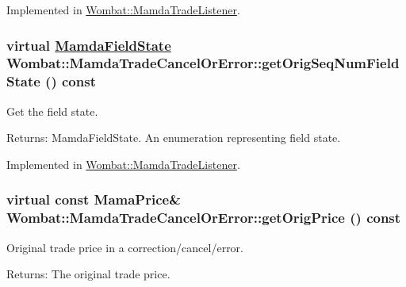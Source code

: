 Implemented in \hyperlink{classWombat_1_1MamdaTradeListener_571a08fa4c669481abf0417a36064205}{Wombat::Mamda\-Trade\-Listener}.\hypertarget{classWombat_1_1MamdaTradeCancelOrError_fb7e94b42033b155bc02f70ed2756062}{
\subsubsection[getOrigSeqNumFieldState]{\setlength{\rightskip}{0pt plus 5cm}virtual \hyperlink{namespaceWombat_93aac974f2ab713554fd12a1fa3b7d2a}{Mamda\-Field\-State} Wombat::Mamda\-Trade\-Cancel\-Or\-Error::get\-Orig\-Seq\-Num\-Field\-State () const}}
\label{classWombat_1_1MamdaTradeCancelOrError_fb7e94b42033b155bc02f70ed2756062}


Get the field state. 

\begin{Desc}
\item[Returns:]Mamda\-Field\-State. An enumeration representing field state. \end{Desc}


Implemented in \hyperlink{classWombat_1_1MamdaTradeListener_0767574a3f0c34ae680fbbfadf296e0e}{Wombat::Mamda\-Trade\-Listener}.\hypertarget{classWombat_1_1MamdaTradeCancelOrError_f30fe9dc7c0325555e8fa31f0865d4b4}{
\subsubsection[getOrigPrice]{\setlength{\rightskip}{0pt plus 5cm}virtual const Mama\-Price\& Wombat::Mamda\-Trade\-Cancel\-Or\-Error::get\-Orig\-Price () const}}
\label{classWombat_1_1MamdaTradeCancelOrError_f30fe9dc7c0325555e8fa31f0865d4b4}


Original trade price in a correction/cancel/error. 

\begin{Desc}
\item[Returns:]The original trade price. \end{Desc}


